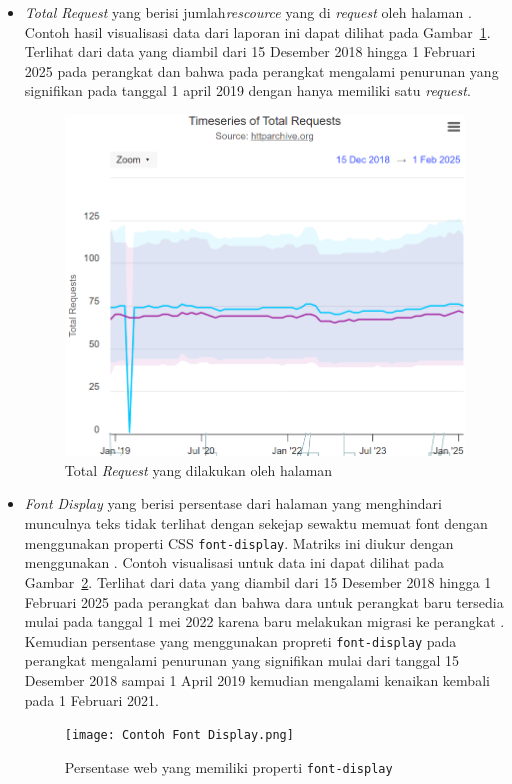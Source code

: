 \begin{itemize}
        
    \item \textit{Total Request} yang berisi jumlah\textit{rescource} yang di \textit{request} oleh halaman \web. Contoh hasil visualisasi data dari laporan ini dapat dilihat pada Gambar~\ref{fig:totalrequest}. Terlihat dari data yang diambil dari 15 Desember 2018 hingga 1 Februari 2025 pada perangkat \desktop dan \mobile bahwa pada perangkat \desktop mengalami penurunan yang signifikan pada tanggal 1 april 2019 dengan hanya memiliki satu \textit{request}.
    \begin{figure}[H]
        \centering
        \includegraphics[width=0.4\linewidth]{Gambar/Contoh Total Request.png}
        \caption{Total \textit{Request} yang dilakukan oleh halaman \web}
        \label{fig:totalrequest}
    \end{figure}

    \item \textit{Font Display} yang berisi persentase dari halaman yang menghindari munculnya teks tidak terlihat dengan sekejap sewaktu \web memuat font dengan menggunakan properti CSS \verb|font-display|. Matriks ini diukur dengan menggunakan \light. Contoh visualisasi untuk data ini dapat dilihat pada Gambar~\ref{fig:fontdisp}. Terlihat dari data yang diambil dari 15 Desember 2018 hingga 1 Februari 2025 pada perangkat \desktop dan \mobile bahwa dara untuk perangkat \desktop baru tersedia mulai pada tanggal 1 mei 2022 karena \light baru melakukan migrasi ke perangkat \desktop. Kemudian persentase \web yang menggunakan propreti \verb|font-display| pada perangkat \mobile mengalami penurunan yang signifikan mulai dari tanggal 15 Desember 2018 sampai 1 April 2019 kemudian mengalami kenaikan kembali pada 1 Februari 2021.
    \begin{figure}[H]
        \centering
        \texttt{[image: Contoh Font Display.png]}
        \caption{Persentase web yang memiliki properti \texttt{font-display}}
        \label{fig:fontdisp}
    \end{figure}
    
\end{itemize}

